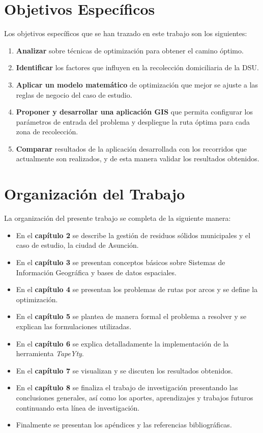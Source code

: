 \section{Objetivos Específicos}

Los objetivos específicos que se han trazado en este trabajo son los siguientes:

\begin{enumerate}
    \item \textbf{Analizar} sobre técnicas de optimización para obtener el camino óptimo. 
    \item \textbf{Identificar} los factores que influyen en la recolección domiciliaria de la DSU.
    \item \textbf{Aplicar un modelo matemático} de optimización que mejor se ajuste a las reglas de negocio del caso de estudio.
    \item \textbf{Proponer y desarrollar una aplicación GIS} que permita configurar los parámetros de entrada del problema y despliegue la ruta óptima para cada zona de recolección.
    \item \textbf{Comparar} resultados de la aplicación desarrollada con los recorridos que actualmente son realizados, y de esta manera validar los resultados obtenidos.
\end{enumerate}

\section{Organización del Trabajo}

La organización del presente trabajo se completa de la siguiente manera:

\begin{itemize}
    \item En el \textbf{capítulo 2} se describe la gestión de residuos sólidos municipales y el caso de estudio, la ciudad de Asunción.
    \item En el \textbf{capítulo 3} se presentan conceptos básicos sobre Sistemas de Información Geográfica y bases de datos espaciales.
    \item En el \textbf{capítulo 4} se presentan los problemas de rutas por arcos y se define la optimización.
    \item En el \textbf{capítulo 5} se plantea de manera formal el problema a resolver y se explican las formulaciones utilizadas.
    \item En el \textbf{capítulo 6} se explica detalladamente la implementación de la herramienta \textit{TapeYty}. 
    \item En el \textbf{capítulo 7} se visualizan y se discuten los resultados obtenidos.
    \item En el \textbf{capítulo 8} se finaliza el trabajo de investigación presentando las conclusiones generales, así como los aportes, aprendizajes y trabajos futuros continuando esta línea de investigación.
    \item Finalmente se presentan los apéndices y las referencias bibliográficas.
\end{itemize}